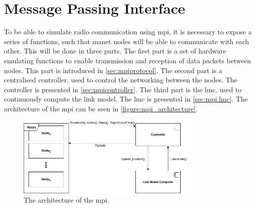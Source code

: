 \chapter{Message Passing Interface}
To be able to simulate radio communication using \gls{mpi}, it is necessary to expose a series of functions, such that \gls{manet} nodes will be able to communicate with each other. This will be done in three parts. The first part is a set of hardware emulating functions to enable transmission and reception of data packets between nodes. This part is introduced in \autoref{sec:mpiprotocol}. The second part is a centralised controller, used to control the networking between the nodes. The controller is presented in \autoref{sec:mpicontroller}. The third part is the \acrfull{lmc}, used to continuously compute the link model. The \acrlong{lmc} is presented in \autoref{sec:mpi:lmc}. The architecture of the \acrlong{mpi} can be seen in \autoref{figure:mpi_architecture}.

\begin{figure}[ht]
    \centering
    \includegraphics[width=0.8\textwidth]{figures/mpi_architecture.png}
    \caption{The architecture of the \acrlong{mpi}.}
    \label{figure:mpi_architecture}
\end{figure}






